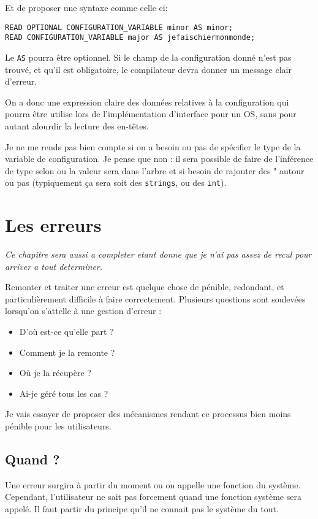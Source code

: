 \documentclass[french]{rtxreport}
\begin{document}
Et de proposer une syntaxe comme celle ci:

\begin{lstlisting}
READ OPTIONAL CONFIGURATION_VARIABLE minor AS minor;
READ CONFIGURATION_VARIABLE major AS jefaischiermonmonde;
\end{lstlisting}
Le \texttt{AS} pourra être optionnel. Si le champ de la configuration donné n’est pas trouvé, et qu’il est obligatoire, le compilateur devra donner un message clair d’erreur.

On a donc une expression claire des données relatives à la configuration qui pourra être utilise lors de l’implémentation d’interface pour un OS, sans pour autant alourdir la lecture des en-têtes.

Je ne me rends pas bien compte si on a besoin ou pas de spécifier le type de la variable de configuration. Je pense que non : il sera possible de faire de l’inférence de type selon ou la valeur sera dans l’arbre et si besoin de rajouter des " autour ou pas (typiquement ça sera soit des \texttt{strings}, ou des \texttt{int}).

\chapter{Les erreurs}

\emph{Ce chapitre sera aussi a completer etant donne que je n'ai pas assez de recul pour arriver a tout determiner.}

Remonter et traiter une erreur est quelque chose de pénible, redondant, et particulièrement difficile à faire correctement. Plusieurs questions sont soulevées lorsqu’on s’attelle à une gestion d’erreur :
\begin{itemize}
	\item D’où est-ce qu’elle part ?
	\item Comment je la remonte ?
	\item Où je la récupère ?
	\item Ai-je géré tous les cas ?
\end{itemize}

Je vais essayer de proposer des mécanismes rendant ce processus bien moins pénible pour les utilisateurs.

\section{Quand ?}
Une erreur surgira à partir du moment ou on appelle une fonction du système. Cependant, l’utilisateur ne sait pas forcement quand une fonction système sera appelé. Il faut partir du principe qu’il ne connait pas le système du tout.
\end{document}
